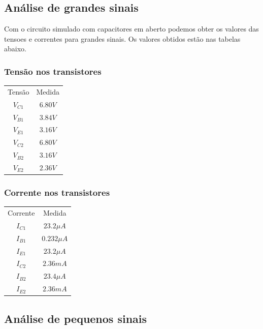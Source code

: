 \subsection{Análise de grandes sinais}

Com o circuito simulado com capacitores em aberto podemos obter os valores das tensoes e correntes para grandes sinais. Os valores obtidos estão nas tabelas abaixo.

\subsubsection{Tensão nos transistores}

\begin{center}
    \begin{tabular}{ |c|c| }
        \hline
        Tensão   & Medida    \\
        $V_{C1}$ & $6.80 V$  \\
        $V_{B1}$ & $3.84 V $ \\
        $V_{E1}$ & $3.16 V $ \\
        $V_{C2}$ & $6.80 V$  \\
        $V_{B2}$ & $3.16 V $ \\
        $V_{E2}$ & $2.36 V $ \\
        \hline
    \end{tabular}
\end{center}

\subsubsection{Corrente nos transistores}

\begin{center}
    \begin{tabular}{ |c|c| }
        \hline
        Corrente & Medida        \\
        $I_{C1}$ & $23.2 \mu A$  \\
        $I_{B1}$ & $0.232 \mu A$ \\
        $I_{E1}$ & $23.2 \mu A$  \\
        $I_{C2}$ & $2.36 mA$     \\
        $I_{B2}$ & $23.4 \mu A$  \\
        $I_{E2}$ & $2.36 mA$     \\
        \hline
    \end{tabular}
\end{center}

\subsection{Análise de pequenos sinais}

